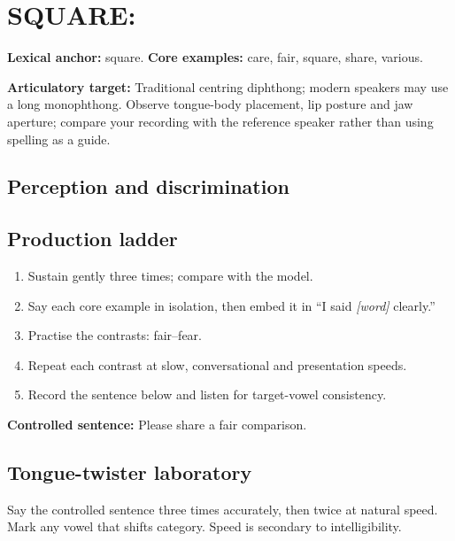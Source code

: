 \section{SQUARE: }
\label{sec:vowel-18}
\textbf{Lexical anchor:} square. \textbf{Core examples:} care, fair, square, share, various.\par
\textbf{Articulatory target:} Traditional centring diphthong; modern speakers may use a long monophthong. Observe tongue-body placement, lip posture and jaw aperture; compare your recording with the reference speaker rather than using spelling as a guide.
\subsection{Perception and discrimination}
\subsection{Production ladder}
\begin{enumerate}[label=\arabic*.]
\item Sustain  gently three times; compare with the model.
\item Say each core example in isolation, then embed it in ``I said \emph{[word]} clearly.''
\item Practise the contrasts: fair--fear.
\item Repeat each contrast at slow, conversational and presentation speeds.
\item Record the sentence below and listen for target-vowel consistency.
\end{enumerate}
\textbf{Controlled sentence:} Please share a fair comparison.
\subsection{Tongue-twister laboratory}
Say the controlled sentence three times accurately, then twice at natural speed. Mark any vowel that shifts category. Speed is secondary to intelligibility.
